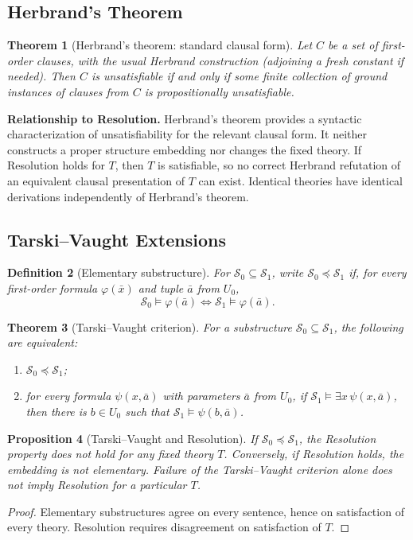 \documentclass[11pt]{article}
\newtheorem{definition}{Definition}
\newtheorem{theorem}[definition]{Theorem}
\newtheorem{proposition}[definition]{Proposition}
\newcommand{\Sat}{\models}
\begin{document}
\subsection{Herbrand's Theorem}
\begin{theorem}[Herbrand's theorem: standard clausal form]
Let $C$ be a set of first-order clauses, with the usual Herbrand construction (adjoining a fresh constant if needed). Then $C$ is unsatisfiable if and only if some \emph{finite} collection of ground instances of clauses from $C$ is propositionally unsatisfiable.
\end{theorem}
\noindent\textbf{Relationship to Resolution.} Herbrand's theorem provides a syntactic characterization of unsatisfiability for the relevant clausal form. It neither constructs a proper structure embedding nor changes the fixed theory. If Resolution holds for $T$, then $T$ is satisfiable, so no correct Herbrand refutation of an equivalent clausal presentation of $T$ can exist. Identical theories have identical derivations independently of Herbrand's theorem.
\subsection{Tarski--Vaught Extensions}
\begin{definition}[Elementary substructure]
For $\mathcal S_0\subseteq\mathcal S_1$, write $\mathcal S_0\preccurlyeq\mathcal S_1$ if, for every first-order formula $\varphi(\bar x)$ and tuple $\bar a$ from $U_0$,
\[
\mathcal S_0\Sat\varphi(\bar a)\iff
\mathcal S_1\Sat\varphi(\bar a).
\]
\end{definition}
\begin{theorem}[Tarski--Vaught criterion]
For a substructure $\mathcal S_0\subseteq\mathcal S_1$, the following are equivalent:
\begin{enumerate}[label=(\roman*)]
\item $\mathcal S_0\preccurlyeq\mathcal S_1$;
\item for every formula $\psi(x,\bar a)$ with parameters $\bar a$ from $U_0$, if $\mathcal S_1\Sat\exists x\,\psi(x,\bar a)$, then there is $b\in U_0$ such that $\mathcal S_1\Sat\psi(b,\bar a)$.
\end{enumerate}
\end{theorem}
\begin{proposition}[Tarski--Vaught and Resolution]
If $\mathcal S_0\preccurlyeq\mathcal S_1$, the Resolution property does not hold for any fixed theory $T$. Conversely, if Resolution holds, the embedding is not elementary. Failure of the Tarski--Vaught criterion alone does not imply Resolution for a particular $T$.
\end{proposition}
\begin{proof}
Elementary substructures agree on every sentence, hence on satisfaction of every theory. Resolution requires disagreement on satisfaction of $T$.
\end{proof}
\end{document}

